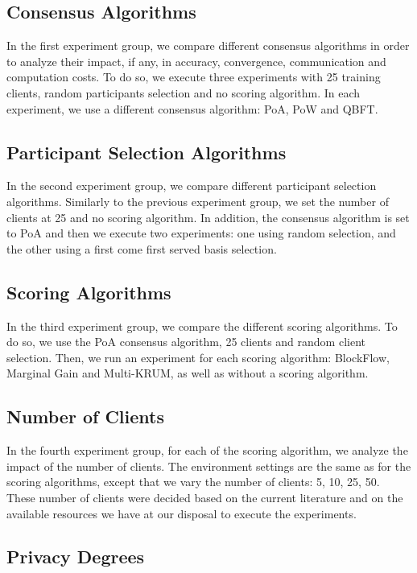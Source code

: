 \subsection{Consensus Algorithms}

In the first experiment group, we compare different consensus algorithms in order to analyze their impact, if any, in accuracy, convergence, communication and computation costs. To do so, we execute three experiments with 25 training clients, random participants selection and no scoring algorithm. In each experiment, we use a different consensus algorithm: PoA, PoW and QBFT.

\subsection{Participant Selection Algorithms}

In the second experiment group, we compare different participant selection algorithms. Similarly to the previous experiment group, we set the number of clients at 25 and no scoring algorithm. In addition, the consensus algorithm is set to PoA and then we execute two experiments: one using random selection, and the other using a first come first served basis selection.

\subsection{Scoring Algorithms}

In the third experiment group, we compare the different scoring algorithms. To do so, we use the PoA consensus algorithm, 25 clients and random client selection. Then, we run an experiment for each scoring algorithm: BlockFlow, Marginal Gain and Multi-KRUM, as well as without a scoring algorithm.

\subsection{Number of Clients}

In the fourth experiment group, for each of the scoring algorithm, we analyze the impact of the number of clients. The environment settings are the same as for the scoring algorithms, except that we vary the number of clients: 5, 10, 25, 50. These number of clients were decided based on the current literature and on the available resources we have at our disposal to execute the experiments.

\subsection{Privacy Degrees}

